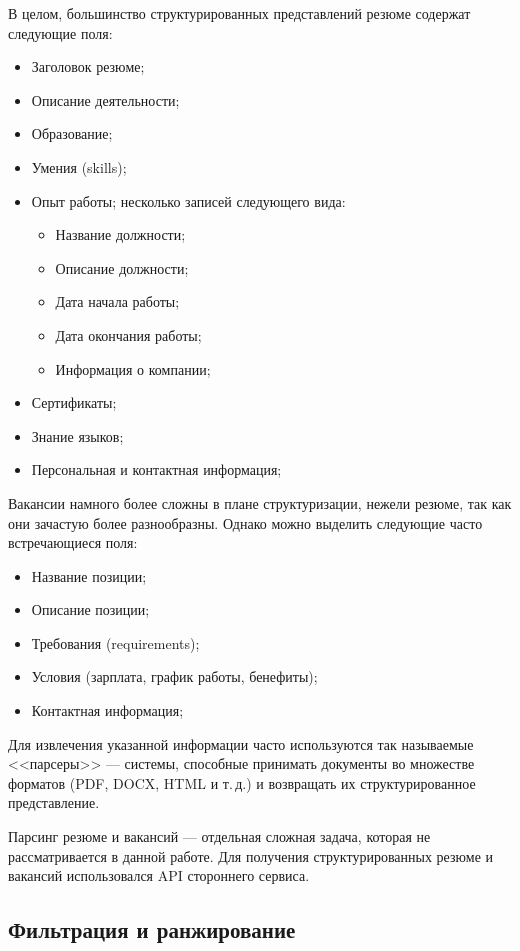\documentclass[14pt]{mmcs_article}
\begin{document}
В целом, большинство структурированных представлений резюме содержат следующие поля:

\begin{itemize}
  \item Заголовок резюме;
  \item Описание деятельности;
  \item Образование;
  \item Умения (skills);
  \item Опыт работы; несколько записей следующего вида:
        \begin{itemize}
          \item Название должности;
          \item Описание должности;
          \item Дата начала работы;
          \item Дата окончания работы;
          \item Информация о компании;
        \end{itemize}
  \item Сертификаты;
  \item Знание языков;
  \item Персональная и контактная информация;
\end{itemize}

Вакансии намного более сложны в плане структуризации, нежели резюме, так как они зачастую более разнообразны. Однако можно выделить следующие часто встречающиеся поля:

\begin{itemize}
  \item Название позиции;
  \item Описание позиции;
  \item Требования (requirements);
  \item Условия (зарплата, график работы, бенефиты);
  \item Контактная информация;
\end{itemize}

Для извлечения указанной информации часто используются так называемые <<парсеры>> --- системы, способные принимать документы во множестве форматов (PDF, DOCX, HTML и т.\,д.) и возвращать их структурированное представление.

Парсинг резюме и вакансий --- отдельная сложная задача, которая не рассматривается в данной работе. Для получения структурированных резюме и вакансий использовался API стороннего сервиса.

\subsection*{Фильтрация и ранжирование}\label{filtering_and_ranking}
\end{document}
